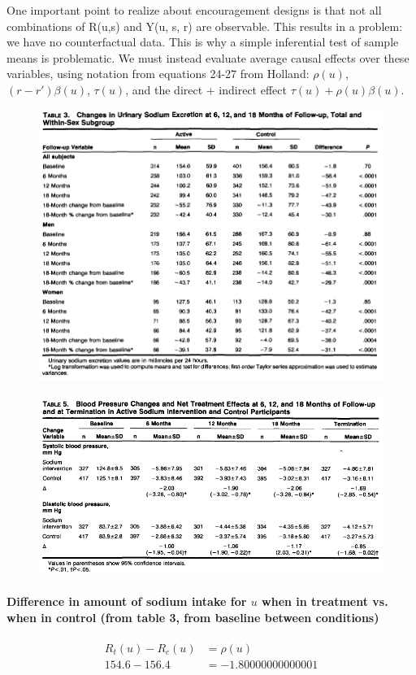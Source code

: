 \documentclass{article}
\begin{document}
One important point to realize about encouragement designs is that not all combinations of R(u,s) and Y(u, s, r) are observable.  This results in a problem: we have no counterfactual data.  This is why a simple inferential test of sample means is problematic.  We must instead evaluate average causal effects over these variables, using notation from equations 24-27 from Holland: $\rho(u)$, $(r-r')\beta(u)$, $\tau(u)$, and the direct + indirect effect $\tau(u) + \rho(u)\beta(u)$.


\begin{figure}[!htf]
\includegraphics[width=\textwidth]{table3}
\end{figure}

\begin{figure}[!htf]
\includegraphics[width=\textwidth]{table5}
\end{figure}

\paragraph{Difference in amount of sodium intake for $u$ when in treatment vs. when in control (from table 3, from baseline between conditions)}
\begin{align*}
R_t(u) - R_c(u) &= \rho(u)\\
154.6 - 156.4 &= -1.80000000000001
\end{align*}
\end{document}
